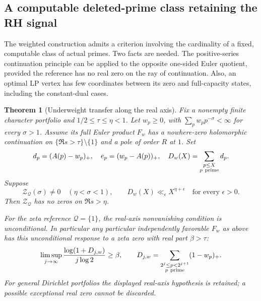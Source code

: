 \documentclass[11pt]{article}
\newtheorem{theorem}{Theorem}[section]
\theoremstyle{definition}
\begin{document}
\subsection{A computable deleted-prime class retaining the RH signal}
\label{sec:computed-deleted-prime-RH}

The weighted construction admits a criterion involving the
cardinality of a fixed, computable class of actual primes.
Two facts are needed. The positive-series continuation principle
can be applied to the opposite one-sided Euler quotient, provided
the reference has no real zero on the ray of continuation.
Also, an optimal LP vertex has few coordinates between its
zero and full-capacity states, including the constant-dual cases.

\begin{theorem}[Underweight transfer along the real axis]
\label{thm:underweight-real-axis-transfer}
Fix a nonempty finite character portfolio and
$1/2\le\tau\le\eta<1$. Let $w_p\ge0$, with
$\sum_p w_p p^{-\sigma}<\infty$ for every $\sigma>1$.
Assume its full Euler product $F_w$ has a nowhere-zero
holomorphic continuation on
$\{\Re s>\tau\}\setminus\{1\}$ and a pole of order $R$ at $1$.
Set
\[
 d_p=(A(p)-w_p)_+,\quad e_p=(w_p-A(p))_+,\quad
 D_w(X)=\sum_{\substack{p\le X\\p\ {\rm prime}}}d_p.
\]
Suppose
\[
 \mathcal Z_{\mathcal Q}(\sigma)\ne0\quad(\eta<\sigma<1),
 \qquad
 D_w(X)\ll_\epsilon X^{\eta+\epsilon}
                       \quad\text{for every }\epsilon>0.
\]
Then $\mathcal Z_{\mathcal Q}$ has no zeros on $\Re s>\eta$.

For the zeta reference $\mathcal Q=\{1\}$, the real-axis
nonvanishing condition is unconditional. In particular any
particular independently favorable $F_w$ as above has this
unconditional response to a zeta zero with real part $\beta>\tau$:
\begin{equation}
 \limsup_{j\to\infty}
 \frac{\log(1+D_{j,w})}{j\log2}\ge\beta,\qquad
 D_{j,w}=\sum_{\substack{2^j\le p<2^{j+1}\\p\ {\rm prime}}}
                          (1-w_p)_+.
 \label{eq:underweight-zero-readout}
\end{equation}
For general Dirichlet portfolios the displayed real-axis
hypothesis is retained; a possible exceptional real zero
cannot be discarded.
\end{theorem}
\end{document}
